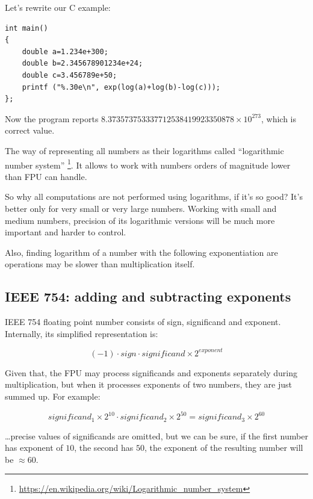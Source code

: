 Let's rewrite our C example:

\begin{lstlisting}[caption=C code]
int main()
{
	double a=1.234e+300;
	double b=2.345678901234e+24;
	double c=3.456789e+50;
	printf ("%.30e\n", exp(log(a)+log(b)-log(c)));
};
\end{lstlisting}

Now the program reports $8.373573753337712538419923350878 \times 10^{273}$, which is correct value.

The way of representing all numbers as their logarithms called ``logarithmic number system''
\footnote{\url{https://en.wikipedia.org/wiki/Logarithmic_number_system}}.
It allows to work with numbers orders of magnitude lower than FPU can handle.

So why all computations are not performed using logarithms, if it's so good?
It's better only for very small or very large numbers.
Working with small and medium numbers, precision of its logarithmic versions will be much more important and harder to control.

Also, finding logarithm of a number with the following exponentiation are operations may be slower than multiplication itself.

\subsection{IEEE 754: adding and subtracting exponents}

IEEE 754 floating point number consists of sign, significand and exponent.
Internally, its simplified representation is:

\begin{equation}
(-1) \cdot sign \cdot significand \times 2^{exponent}
\end{equation}

Given that, the FPU may process significands and exponents separately during multiplication, 
but when it processes exponents of two numbers, they are just summed up.
For example:

\begin{equation}
significand_{1} \times 2^{10} \cdot significand_{2} \times 2^{50} = significand_{3} \times 2^{60}
\end{equation}

\dots precise values of significands are omitted, but we can be sure, if the first number has exponent of $10$, the second has $50$,
the exponent of the resulting number will be $\approx 60$.


